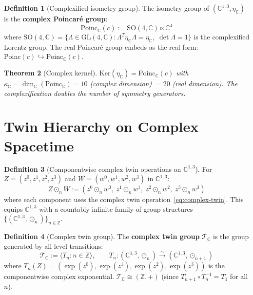 \documentclass[12pt]{article}
\theoremstyle{plain}
\newtheorem{theorem}{Theorem}[section]
\theoremstyle{definition}
\newtheorem{definition}[theorem]{Definition}
\theoremstyle{remark}
\newcommand{\Ker}{\mathrm{Ker}}
\newcommand{\Poinc}{\mathrm{Poinc}}
\newcommand{\SO}{\mathrm{SO}}
\newcommand{\GL}{\mathrm{GL}}
\newcommand{\CC}{\mathbb{C}}
\newcommand{\ZZ}{\mathbb{Z}}
\begin{document}
\begin{definition}[Complexified isometry group]\label{def:complex-isom}
The isometry group of $(\CC^{1,3}, \eta_\CC)$ is the \textbf{complex Poincar\'e group}:
\begin{equation}
\Poinc_\CC(c) := \SO(4, \CC) \ltimes \CC^4
\end{equation}
where $\SO(4, \CC) = \{\Lambda \in \GL(4, \CC) : \Lambda^T\eta_\CC\Lambda = \eta_\CC,\; \det\Lambda = 1\}$ is the complexified Lorentz group. The real Poincar\'e group embeds as the real form: $\Poinc(c) \hookrightarrow \Poinc_\CC(c)$.
\end{definition}

\begin{theorem}[Complex kernel]\label{thm:complex-kernel}
$\Ker(\eta_\CC) = \Poinc_\CC(c)$ with $\kappa_\CC = \dim_\CC(\Poinc_\CC) = 10$ (complex dimension) $= 20$ (real dimension). The complexification doubles the number of symmetry generators.
\end{theorem}


\section{Twin Hierarchy on Complex Spacetime}
\label{sec:complex-twin-st}

\begin{definition}[Componentwise complex twin operations on $\CC^{1,3}$]\label{def:twin-st}
For $Z = (z^0, z^1, z^2, z^3)$ and $W = (w^0, w^1, w^2, w^3)$ in $\CC^{1,3}$:
\begin{equation}
Z \odot_n W := (z^0 \odot_n w^0,\; z^1 \odot_n w^1,\; z^2 \odot_n w^2,\; z^3 \odot_n w^3)
\end{equation}
where each component uses the complex twin operation~\eqref{eq:complex-twin}. This equips $\CC^{1,3}$ with a countably infinite family of group structures $\{(\CC^{1,3}, \odot_n)\}_{n \in \ZZ}$.
\end{definition}

\begin{definition}[Complex twin group]\label{def:twin-group}
The \textbf{complex twin group} $\mathcal{T}_\CC$ is the group generated by all level transitions:
\begin{equation}
\mathcal{T}_\CC := \langle T_n : n \in \ZZ \rangle, \qquad T_n: (\CC^{1,3}, \odot_n) \xrightarrow{\sim} (\CC^{1,3}, \odot_{n+1})
\end{equation}
where $T_n(Z) = (\exp(z^0), \exp(z^1), \exp(z^2), \exp(z^3))$ is the componentwise complex exponential. $\mathcal{T}_\CC \cong (\ZZ, +)$ (since $T_{n+1} \circ T_n^{-1} = T_1$ for all $n$).
\end{definition}
\end{document}
